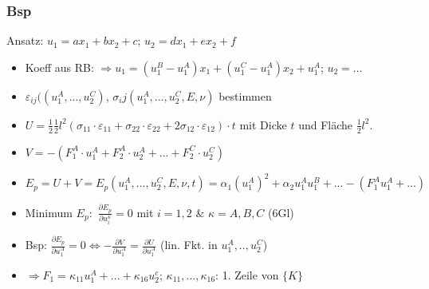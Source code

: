         \subsubsection{Bsp}
            Ansatz: $u_1=ax_1+bx_2+c$; $u_2=dx_1+ex_2+f$
            \begin{itemize}
                \item Koeff aus RB: $\Rightarrow u_1=(u_1^B-u_1^A)x_1+(u_1^C-u_1^A)x_2+u_1^A$; $u_2=\dots$
                \item $\varepsilon_{ij}((u_1^A,...,u_2^C)$, $\sigma_ij(u_1^A,...,u_2^C,E,\nu)$ bestimmen
                \item $U=\frac{1}{2}\frac{1}{2}l^2(\sigma_{11}\cdot\varepsilon_{11}+\sigma_{22}\cdot\varepsilon_{22}+2\sigma_{12}\cdot\varepsilon_{12})\cdot t$ mit Dicke $t$ und Fläche $\frac{1}{2}l^2$.
                \item $V=-(F_1^A\cdot u_1^A+F_2^A\cdot u_2^A+...+F_2^C\cdot u_2^C)$
                \item $E_p=U+V=E_p(u_1^A,...,u_2^C,E,\nu,t)=\alpha_1(u_1^A)^2+\alpha_2u_1^Au_1^B+ ...-(F_1^Au_1^A+...)$
                \item Minimum $E_p:$ $\displaystyle\frac{\partial E_p}{\partial u_i^\kappa}=0$ mit $i=1,2$ \& $\kappa=A,B,C$ (6Gl)
                \item Bsp: $\displaystyle\frac{\partial E_p}{\partial u_1^A}=0 \Leftrightarrow -\frac{\partial V}{\partial u_1^A}=\frac{\partial U}{\partial u_1^A}$ (lin. Fkt. in $u_1^A,..,u_2^C$) 
                \item $\Rightarrow F_1=\kappa_{11}u_1^A+...+\kappa_{16}u_2^c$; $\kappa_{11},...,\kappa_{16}$: 1. Zeile von $\{K\}$
            \end{itemize}
            